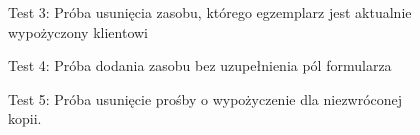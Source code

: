 \begin{figure}[H]
    \centering
    \caption{Test 3: Próba usunięcia zasobu, którego egzemplarz jest aktualnie wypożyczony klientowi}
\end{figure}

\begin{figure}[H]
    \centering
    \caption{Test 4: Próba dodania zasobu bez uzupełnienia pól formularza}
\end{figure}

\begin{figure}[H]
    \centering
    \caption{Test 5: Próba usunięcie prośby o wypożyczenie dla niezwróconej kopii.}
\end{figure}

